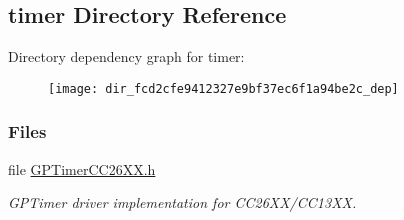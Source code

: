 \subsection{timer Directory Reference}
\label{dir_fcd2cfe9412327e9bf37ec6f1a94be2c}
Directory dependency graph for timer\+:
\nopagebreak
\begin{figure}[H]
\begin{center}
\leavevmode
\texttt{[image: dir\_fcd2cfe9412327e9bf37ec6f1a94be2c\_dep]}
\end{center}
\end{figure}
\subsubsection*{Files}
\begin{DoxyCompactItemize}
\item 
file \hyperlink{_g_p_timer_c_c26_x_x_8h}{G\+P\+Timer\+C\+C26\+X\+X.\+h}
\begin{DoxyCompactList}\small\item\em G\+P\+Timer driver implementation for C\+C26\+X\+X/\+C\+C13\+X\+X. \end{DoxyCompactList}\end{DoxyCompactItemize}
